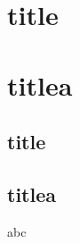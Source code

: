 \documentclass[compress]{beamer}
\begin{document}
\section{title}
\section{titlea}
\subsection{title}
\subsection{titlea}
\begin{frame}
    abc
\end{frame} 
\end{document}
